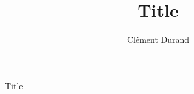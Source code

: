 \documentclass{beamerx}
\title[Subtitle]
      {Title}
      [Short title]
\author{Clément Durand}
\begin{document}
\maketitle

\begin{frame}{Title}
  \lipsum[1]
\end{frame}
\end{document}
